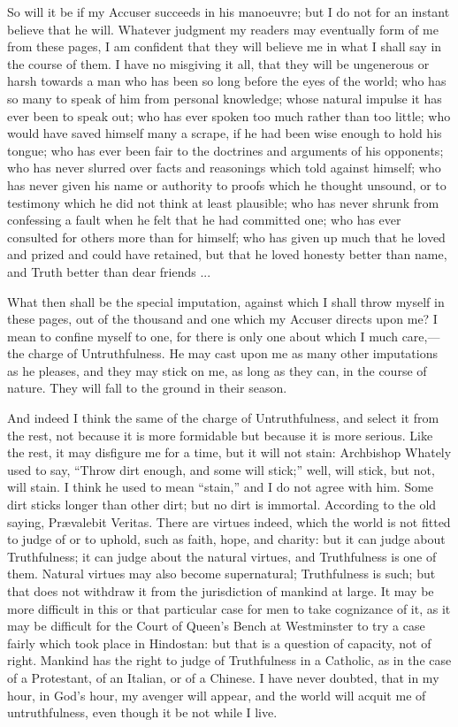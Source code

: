 So will it be if my Accuser succeeds in his manoeuvre; but I do
not for an instant believe that he will. Whatever judgment my readers
may eventually form of me from these pages, I am confident that they
will believe me in what I shall say in the course of them. I have no
misgiving it all, that they will be ungenerous or harsh towards a man who
has been so long before the eyes of the world; who has so many to
speak of him from personal knowledge; whose natural impulse it has
ever been to speak out; who has ever spoken too much rather than too
little; who would have saved himself many a scrape, if he had been
wise enough to hold his tongue; who has ever been fair to the
doctrines and arguments of his opponents; who has never slurred over
facts and reasonings which told against himself; who has never given
his name or authority to proofs which he thought unsound, or to
testimony which he did not think at least plausible; who has never
shrunk from confessing a fault when he felt that he had committed one;
who has ever consulted for others more than for himself; who has given
up much that he loved and prized and could have retained, but that he
loved honesty better than name, and Truth better than dear friends ...

What then shall be the special imputation, against which I shall throw
myself in these pages, out of the thousand and one which my Accuser
directs upon me? I mean to confine myself to one, for there is only
one about which I much care,—the charge of Untruthfulness. He may
cast upon me as many other imputations as he pleases, and they may
stick on me, as long as they can, in the course of nature. They will
fall to the ground in their season.

And indeed I think the same of the charge of Untruthfulness, and select it from the rest, not because it is more
formidable but
because it is more serious. Like the rest, it may disfigure me for a
time, but it will not stain: Archbishop Whately used to say,
``Throw dirt enough, and some will stick;'' well, will stick,
but not, will stain. I think he used to mean
``stain,'' and I do not agree with him. Some dirt sticks
longer than other dirt; but no dirt is immortal. According to the old
saying, Prævalebit Veritas. There are virtues indeed,
which the world is not fitted to judge of or to uphold, such as
faith, hope, and charity: but it can judge about Truthfulness; it can
judge about the natural virtues, and Truthfulness is one of them.
Natural virtues may also become supernatural; Truthfulness is such;
but that does not withdraw it from the jurisdiction of mankind at
large. It may be more difficult in this or that particular case for
men to take cognizance of it, as it may be difficult for the
Court of Queen's Bench at Westminster to try a case fairly which
took place in Hindostan:
but that is a question of capacity, not of right. Mankind has the
right to judge of Truthfulness in a Catholic, as in the
case of a Protestant, of an Italian, or of a Chinese. I have never
doubted, that in my hour, in God's hour, my avenger will appear, and
the world will acquit me of untruthfulness, even though it be not
while I live.

